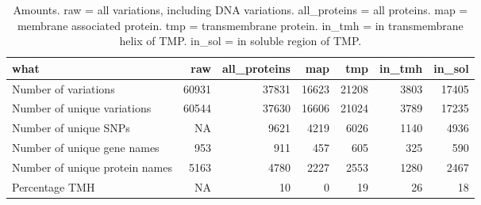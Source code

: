 \begin{table}

\caption{\label{tab:ncbi_counts}Amounts. raw = all variations, including DNA variations. all\_proteins = all proteins. map = membrane associated protein. tmp = transmembrane protein. in\_tmh = in transmembrane helix of TMP. in\_sol = in soluble region of TMP. }
\centering
\begin{tabular}[t]{l|r|r|r|r|r|r}
\hline
what & raw & all\_proteins & map & tmp & in\_tmh & in\_sol\\
\hline
Number of variations & 60931 & 37831 & 16623 & 21208 & 3803 & 17405\\
\hline
Number of unique variations & 60544 & 37630 & 16606 & 21024 & 3789 & 17235\\
\hline
Number of unique SNPs & NA & 9621 & 4219 & 6026 & 1140 & 4936\\
\hline
Number of unique gene names & 953 & 911 & 457 & 605 & 325 & 590\\
\hline
Number of unique protein names & 5163 & 4780 & 2227 & 2553 & 1280 & 2467\\
\hline
Percentage TMH & NA & 10 & 0 & 19 & 26 & 18\\
\hline
\end{tabular}
\end{table}
